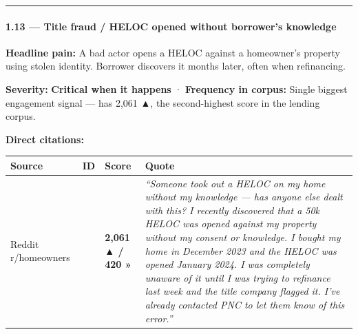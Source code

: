 \documentclass[
  10pt,
]{article}
\let\origtexttt\texttt
\renewcommand{\texttt}[1]{\origtexttt{\seqsplit{#1}}}
\begin{document}
\begin{center}\rule{0.5\linewidth}{0.5pt}\end{center}

\hypertarget{title-fraud-heloc-opened-without-borrowers-knowledge}{%
\paragraph{1.13 --- Title fraud / HELOC opened without borrower's
knowledge}\label{title-fraud-heloc-opened-without-borrowers-knowledge}}

\textbf{Headline pain:} A bad actor opens a HELOC against a homeowner's property using stolen
identity. Borrower discovers it months later, often when refinancing.

\textbf{Severity:} \textbf{Critical when it happens} · \textbf{Frequency in corpus:} Single biggest
engagement signal --- \texttt{1ovg9rh} has 2,061 ▲, the second-highest score in the lending corpus.

\textbf{Direct citations:}

\begin{longtable}[]{@{}llll@{}}
\toprule
\begin{minipage}[b]{0.20\columnwidth}\raggedright
Source\strut
\end{minipage} & \begin{minipage}[b]{0.14\columnwidth}\raggedright
ID\strut
\end{minipage} & \begin{minipage}[b]{0.10\columnwidth}\raggedright
Score\strut
\end{minipage} & \begin{minipage}[b]{0.44\columnwidth}\raggedright
Quote\strut
\end{minipage}\tabularnewline
\midrule
\endhead
\begin{minipage}[t]{0.20\columnwidth}\raggedright
Reddit r/homeowners\strut
\end{minipage} & \begin{minipage}[t]{0.14\columnwidth}\raggedright
\texttt{1ovg9rh}\strut
\end{minipage} & \begin{minipage}[t]{0.10\columnwidth}\raggedright
\textbf{2,061 ▲ / 420 »}\strut
\end{minipage} & \begin{minipage}[t]{0.44\columnwidth}\raggedright
\emph{``Someone took out a HELOC on my home without my knowledge --- has anyone else dealt with
this? I recently discovered that a 50k HELOC was opened against my property without my consent or
knowledge. I bought my home in December 2023 and the HELOC was opened January 2024. I was completely
unaware of it until I was trying to refinance last week and the title company flagged it. I've
already contacted PNC to let them know of this error.''}\strut
\end{minipage}\tabularnewline
\bottomrule
\end{longtable}
\end{document}
